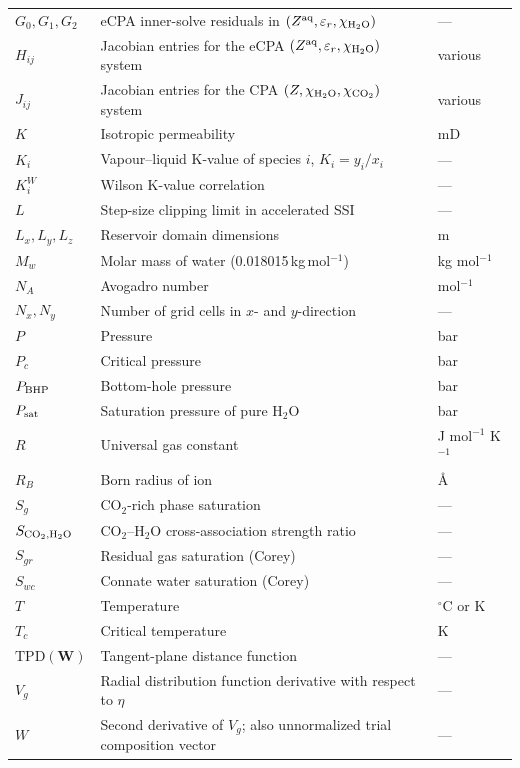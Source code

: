\documentclass[preprint,12pt,number]{elsarticle}
\begin{document}
\begin{longtable}{@{}p{}p{}p{}@{}}
  $G_0, G_1, G_2$ & eCPA inner-solve residuals in $(Z^{\rm aq},\varepsilon_r,\chi_{\rm H_2O})$ & --- \\
  $H_{ij}$ & Jacobian entries for the eCPA $(Z^{\rm aq},\varepsilon_r,\chi_{\rm H_2O})$ system & various \\
  $J_{ij}$ & Jacobian entries for the CPA $(Z,\chi_{\rm H_2O},\chi_{\rm CO_2})$ system & various \\
  $K$ & Isotropic permeability & mD \\
  $K_i$ & Vapour--liquid K-value of species $i$, $K_i = y_i/x_i$ & --- \\
  $K_i^W$ & Wilson K-value correlation & --- \\
  $L$ & Step-size clipping limit in accelerated SSI & --- \\
  $L_x, L_y, L_z$ & Reservoir domain dimensions & m \\
  $M_w$ & Molar mass of water (0.018015\,kg\,mol$^{-1}$) & kg mol$^{-1}$ \\
  $N_A$ & Avogadro number & mol$^{-1}$ \\
  $N_x, N_y$ & Number of grid cells in $x$- and $y$-direction & --- \\
  $P$ & Pressure & bar \\
  $P_c$ & Critical pressure & bar \\
  $P_{\rm BHP}$ & Bottom-hole pressure & bar \\
  $P_{\rm sat}$ & Saturation pressure of pure H$_2$O & bar \\
  $R$ & Universal gas constant & J mol$^{-1}$ K$^{-1}$ \\
  $R_B$ & Born radius of ion & \AA \\
  $S_g$ & CO$_2$-rich phase saturation & --- \\
  $S_{{\rm CO_2},{\rm H_2O}}$ & CO$_2$--H$_2$O cross-association strength ratio & --- \\
  $S_{gr}$ & Residual gas saturation (Corey) & --- \\
  $S_{wc}$ & Connate water saturation (Corey) & --- \\
  $T$ & Temperature & $^\circ$C or K \\
  $T_c$ & Critical temperature & K \\
  $\text{TPD}(\mathbf{W})$ & Tangent-plane distance function & --- \\
  $V_g$ & Radial distribution function derivative with respect to $\eta$ & --- \\
  $W$ & Second derivative of $V_g$; also unnormalized trial composition vector & --- \\

\end{longtable}
\end{document}
